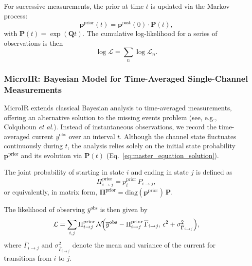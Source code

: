 \documentclass[pdflatex,sn-mathphys-num]{sn-jnl}%
\theoremstyle{thmstyleone}%
\theoremstyle{thmstyletwo}%
\theoremstyle{thmstylethree}%
\begin{document}
For successive measurements, the prior at time \(t\) is updated via the Markov process:
\begin{equation}
	\boldsymbol{p}^{\text{prior}}(t) = \boldsymbol{p}^{\text{post}}(0) \cdot \boldsymbol{P}(t),
	\label{eq:prior_update_short}
\end{equation}
with \(\boldsymbol{P}(t)=\exp(\boldsymbol{Q}t)\). The cumulative log-likelihood for a series of observations is then
\begin{equation}
	\log \mathcal{L} = \sum_n \log \mathcal{L}_n.
	\label{eq:total_loglikelihood_short}
\end{equation}


\subsubsection{MicroIR: Bayesian Model for Time-Averaged Single-Channel Measurements}

MicroIR extends classical Bayesian analysis to time-averaged measurements, offering an alternative solution to the missing events problem (see, e.g., Colquhoun \textit{et al.}). Instead of instantaneous observations, we record the time-averaged current \(\overline{y}^{\text{obs}}\) over an interval \(t\). Although the channel state fluctuates continuously during \(t\), the analysis relies solely on the initial state probability \(\boldsymbol{p}^{\text{prior}}\) and its evolution via \(\mathbf{P}(t)\) (Eq.~\ref{eq:master_equation_solution}).

The joint probability of starting in state \(i\) and ending in state \(j\) is defined as
\begin{equation}
	\Pi_{i\rightarrow j}^{\text{prior}} = p_i^{\text{prior}}\,P_{i\rightarrow j},
	\label{eq:joint_state_probability_short}
\end{equation}
or equivalently, in matrix form, \(\boldsymbol{\Pi}^{\text{prior}} = \mathrm{diag}(\boldsymbol{p}^{\text{prior}})\,\mathbf{P}\).

The likelihood of observing \(\overline{y}^{\text{obs}}\) is then given by
\begin{equation}
	\mathcal{L} = \sum_{i,j} \Pi_{i\rightarrow j}^{\text{prior}}\,\mathcal{N}\!\Bigl(\overline{y}^{\text{obs}} - \Pi_{i\rightarrow j}^{\text{prior}}\,\overline{\Gamma}_{i\rightarrow j},\, \epsilon^2 + \sigma^2_{\overline{\Gamma}_{i\rightarrow j}}\Bigr),
	\label{eq:integrated_likelihood_short}
\end{equation}
where \(\overline{\Gamma}_{i\rightarrow j}\) and \(\sigma^2_{\overline{\Gamma}_{i\rightarrow j}}\) denote the mean and variance of the current for transitions from \(i\) to \(j\).
\end{document}
